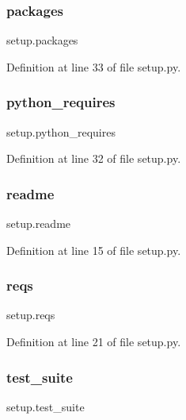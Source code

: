 \subsubsection{\texorpdfstring{packages}{packages}}
{\footnotesize\ttfamily setup.\+packages}



Definition at line 33 of file setup.\+py.

\mbox{\label{namespacesetup_aa7ca7bc9391b217e81efeb03689d8dbf}} 
\subsubsection{\texorpdfstring{python\+\_\+requires}{python\_requires}}
{\footnotesize\ttfamily setup.\+python\+\_\+requires}



Definition at line 32 of file setup.\+py.

\mbox{\label{namespacesetup_af307481f158da7b58a33229df5e30c6c}} 
\subsubsection{\texorpdfstring{readme}{readme}}
{\footnotesize\ttfamily setup.\+readme}



Definition at line 15 of file setup.\+py.

\mbox{\label{namespacesetup_a0c29631fa586cf133cd55999a817f46b}} 
\subsubsection{\texorpdfstring{reqs}{reqs}}
{\footnotesize\ttfamily setup.\+reqs}



Definition at line 21 of file setup.\+py.

\mbox{\label{namespacesetup_afd7a7f31bfa5027bfe335aedfcc1b70e}} 
\subsubsection{\texorpdfstring{test\+\_\+suite}{test\_suite}}
{\footnotesize\ttfamily setup.\+test\+\_\+suite}



